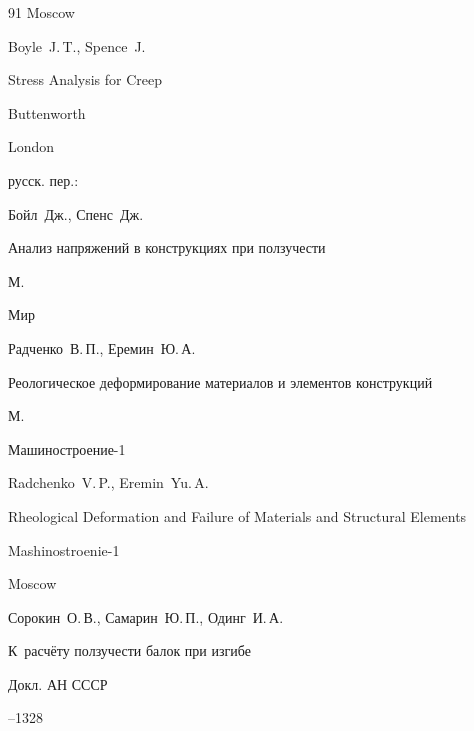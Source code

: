 \begin{thebibliography}{91}
\publaddr Moscow






\by  Boyle~J.\,T., Spence~J.

\book Stress Analysis for Creep

\publ Buttenworth 

\publaddr London



\rtransl русск. пер.:~

\by Бойл~Дж., Спенс~Дж.

\book Анализ напряжений в конструкциях при ползучести

\publaddr М.

\publ Мир






\by Радченко~В.\,П.,  Еремин~Ю.\,А.

\book Реологическое деформирование материалов и элементов конструкций

\publaddr М.

\publ Машиностроение-1



\misctransl

\by  Radchenko~V.\,P.,  Eremin~Yu.\,A.

\book Rheological Deformation and Failure of Materials and Structural Elements

\publ Mashinostroenie-1

\publaddr Moscow 






\by Сорокин~О.\,В., Самарин~Ю.\,П., Одинг~И.\,А.

\paper К~расчёту ползучести балок при изгибе

\jour Докл. АН СССР




--1328


\end{thebibliography}
